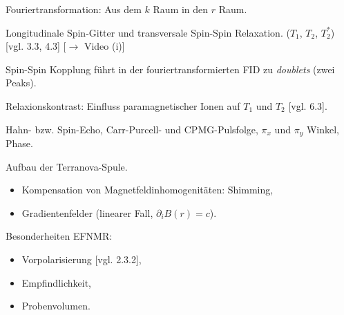 \documentclass{subfiles}
\begin{document}
    \begin{Frage}
        Fouriertransformation: Aus dem $k$ Raum in den $r$ Raum. 
    \end{Frage}
    \begin{Antwort}
        
    \end{Antwort}

    \begin{Frage}
        Longitudinale Spin-Gitter und transversale Spin-Spin Relaxation. ($T_1$, $T_2$, $T_2^*$) [vgl. 3.3, 4.3] [$\to$ Video (i)]
    \end{Frage}
    \begin{Antwort}
        

        Spin-Spin Kopplung führt in der fouriertransformierten FID zu \emph{doublets} (zwei Peaks). 
    \end{Antwort}

    \begin{Frage}
        Relaxionskontrast: Einfluss paramagnetischer Ionen auf $T_1$ und $T_2$ [vgl. 6.3].
    \end{Frage}
    \begin{Antwort}
        
    \end{Antwort}

    \begin{Frage}
        Hahn- bzw. Spin-Echo, Carr-Purcell- und CPMG-Pulsfolge, $\pi_x$ und $\pi_y$ Winkel, Phase.
    \end{Frage}
    \begin{Antwort}
        
    \end{Antwort}

    \begin{Frage}
        Aufbau der Terranova-Spule.
        \begin{itemize}[label=$\to$]
            \item Kompensation von Magnetfeldinhomogenitäten: Shimming,
            \item Gradientenfelder (linearer Fall, $\partial_i B(r) = c$).
        \end{itemize}
    \end{Frage}
    \begin{Antwort}
        
    \end{Antwort}

    \begin{Frage}
        Besonderheiten EFNMR:
        \begin{itemize}[label=$\to$]
            \item Vorpolarisierung [vgl. 2.3.2],
            \item Empfindlichkeit,
            \item Probenvolumen.
        \end{itemize}
    \end{Frage}
    \begin{Antwort}
        
    \end{Antwort}
\end{document}
